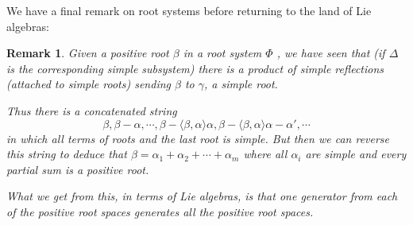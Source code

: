 \documentclass[12pt]{article}
\theoremstyle{nonumberbreak}
\theoremstyle{changebreak}
\theoremstyle{nonumberbreak}
\theoremstyle{change}
\newtheorem{rmk}[thm]{Remark}
\begin{document}
We have a final remark on root systems before returning to the land of Lie algebras:
\begin{rmk}
	Given a positive root $\beta$ in a root system $\Phi$ , we have seen that (if $\Delta$ is the corresponding simple subsystem)
	there is a product of simple reflections (attached to simple roots) sending $\beta$ to $\gamma$, a simple root.

	Thus there is a concatenated string
	\[\beta,\beta-\alpha,\cdots,\beta-\langle\beta,\alpha\rangle\alpha,\beta-\langle\beta,\alpha\rangle\alpha-\alpha',\cdots\]
	in which all terms of roots and the last root is simple. But then we can reverse this string to deduce that
	$\beta=\alpha_1+\alpha_2+\cdots+\alpha_m$ where all $\alpha_i$ are simple and every partial sum is a positive root.

	What we get from this, in terms of Lie algebras, is that one generator from each of the positive root spaces generates all the positive root spaces.
\end{rmk}
\end{document}
